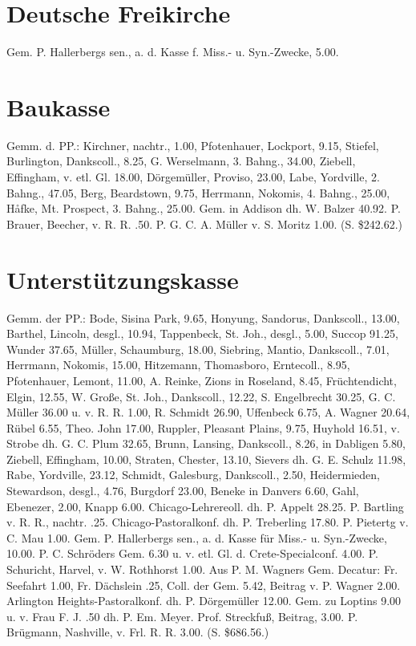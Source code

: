 \section{Deutsche Freikirche}
Gem. P. Hallerbergs sen., a. d. Kasse f. Miss.- u. Syn.-Zwecke, 5.00.

\section{Baukasse}
Gemm. d. PP.: Kirchner, nachtr., 1.00, Pfotenhauer, Lockport, 9.15, Stiefel, Burlington, Dankscoll., 8.25, G. Werselmann, 3. Bahng., 34.00, Ziebell, Effingham, v. etl. Gl. 18.00, Dörgemüller, Proviso, 23.00, Labe, Yordville, 2. Bahng., 47.05, Berg, Beardstown, 9.75, Herrmann, Nokomis, 4. Bahng., 25.00, Håfke, Mt. Prospect, 3. Bahng., 25.00. Gem. in Addison dh. W. Balzer 40.92. P. Brauer, Beecher, v. R. R. .50. P. G. C. A. Müller v. S. Moritz 1.00. (S. \$242.62.)

\section{Unterstützungskasse}
Gemm. der PP.: Bode, Sisina Park, 9.65, Honyung, Sandorus, Dankscoll., 13.00, Barthel, Lincoln, desgl., 10.94, Tappenbeck, St. Joh., desgl., 5.00, Succop 91.25, Wunder 37.65, Müller, Schaumburg, 18.00, Siebring, Mantio, Dankscoll., 7.01, Herrmann, Nokomis, 15.00, Hitzemann, Thomasboro, Erntecoll., 8.95, Pfotenhauer, Lemont, 11.00, A. Reinke, Zions in Roseland, 8.45, Früchtendicht, Elgin, 12.55, W. Große, St. Joh., Dankscoll., 12.22, S. Engelbrecht 30.25, G. C. Müller 36.00 u. v. R. R. 1.00, R. Schmidt 26.90, Uffenbeck 6.75, A. Wagner 20.64, Rübel 6.55, Theo. John 17.00, Ruppler, Pleasant Plains, 9.75, Huyhold 16.51, v. Strobe dh. G. C. Plum 32.65, Brunn, Lansing, Dankscoll., 8.26, in Dabligen 5.80, Ziebell, Effingham, 10.00, Straten, Chester, 13.10, Sievers dh. G. E. Schulz 11.98, Rabe, Yordville, 23.12, Schmidt, Galesburg, Dankscoll., 2.50, Heidermieden, Stewardson, desgl., 4.76, Burgdorf 23.00, Beneke in Danvers 6.60, Gahl, Ebenezer, 2.00, Knapp 6.00. Chicago-Lehrereoll. dh. P. Appelt 28.25. P. Bartling v. R. R., nachtr. .25. Chicago-Pastoralkonf. dh. P. Treberling 17.80. P. Pietertg v. C. Mau 1.00. Gem. P. Hallerbergs sen., a. d. Kasse für Miss.- u. Syn.-Zwecke, 10.00. P. C. Schröders Gem. 6.30 u. v. etl. Gl. d. Crete-Specialconf. 4.00. P. Schuricht, Harvel, v. W. Rothhorst 1.00. Aus P. M. Wagners Gem. Decatur: Fr. Seefahrt 1.00, Fr. Dächslein .25, Coll. der Gem. 5.42, Beitrag v. P. Wagner 2.00. Arlington Heights-Pastoralkonf. dh. P. Dörgemüller 12.00. Gem. zu Loptins 9.00 u. v. Frau F. J. .50 dh. P. Em. Meyer. Prof. Streckfuß, Beitrag, 3.00. P. Brügmann, Nashville, v. Frl. R. R. 3.00. (S. \$686.56.)

